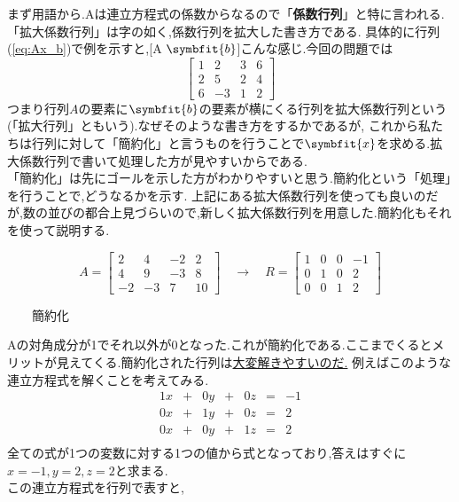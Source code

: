 まず用語から.Aは連立方程式の係数からなるので「\textbf{係数行列}」と特に言われる.「拡大係数行列」は字の如く,係数行列を拡大した書き方である.
具体的に行列(\ref{eq:Ax_b})で例を示すと,[A $\symbfit{b}$]こんな感じ.今回の問題では\\
\[
\begin{bmatrix}
    1 & 2 & 3 & 6 \\
    2 & 5 & 2 & 4 \\
    6 & -3 & 1 & 2
\end{bmatrix}
\]
つまり行列$A$の要素に$\symbfit{b}$の要素が横にくる行列を拡大係数行列という(「拡大行列」ともいう).なぜそのような書き方をするかであるが,
これから私たちは行列に対して「簡約化」と言うものを行うことで$\symbfit{x}$を求める.拡大係数行列で書いて処理した方が見やすいからである.
\bigskip\\
「簡約化」は先にゴールを示した方がわかりやすいと思う.簡約化という「処理」を行うことで,どうなるかを示す.
上記にある拡大係数行列を使っても良いのだが,数の並びの都合上見づらいので,新しく拡大係数行列を用意した.簡約化もそれを使って説明する.
\begin{framed}
\[A=
\begin{bmatrix}
    2& 4 & -2 & 2 \\
    4 & 9 & -3 & 8 \\
    -2 & -3 & 7 & 10
\end{bmatrix}
\quad\rightarrow\quad R=
\begin{bmatrix}
    1& 0 & 0 & -1 \\
    0 & 1 & 0 & 2 \\
    0 & 0 & 1 & 2
\end{bmatrix}
\]
\begin{center}
    　　簡約化\\
\end{center}
\vspace{-4mm}
\end{framed}
Aの対角成分が1でそれ以外が0となった.これが簡約化である.ここまでくるとメリットが見えてくる.簡約化された行列は\underline{大変解きやすいのだ.}
例えばこのような連立方程式を解くことを考えてみる.
\[
\begin{array}{ccccccc}
    1x & + &0y & +&0z &= &-1 \\
   0x & +&1y & +&0z &= &2 \\
   0x & + &0y & +&1z &= &2 \\
\end{array}
\]
全ての式が1つの変数に対する1つの値から式となっており,答えはすぐに$x=-1,y=2,z=2$と求まる.\\
この連立方程式を行列で表すと,
